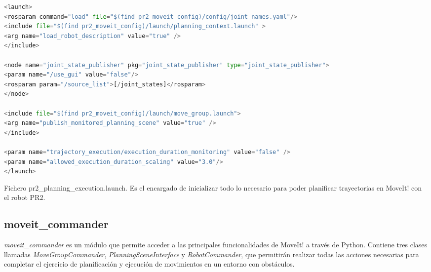 \documentclass[12pt,spanish,chapterprefix, numbers=noenddot]{book}
\numberwithin{equation}{section}
\numberwithin{figure}{section}
\begin{document}
\begin{algorithm}[htb!]
	\begin{lstlisting}[breaklines=true,language=python]  
<launch>
<rosparam command="load" file="$(find pr2_moveit_config)/config/joint_names.yaml"/>
<include file="$(find pr2_moveit_config)/launch/planning_context.launch" >
<arg name="load_robot_description" value="true" />
</include>

<node name="joint_state_publisher" pkg="joint_state_publisher" type="joint_state_publisher">
<param name="/use_gui" value="false"/>
<rosparam param="/source_list">[/joint_states]</rosparam>
</node>

<include file="$(find pr2_moveit_config)/launch/move_group.launch">
<arg name="publish_monitored_planning_scene" value="true" />
</include>

<param name="trajectory_execution/execution_duration_monitoring" value="false" />
<param name="allowed_execution_duration_scaling" value="3.0"/>
</launch>
	\end{lstlisting}
\caption{\label{alg:pr2_planning_execution}Fichero pr2\_planning\_execution.launch. Es el encargado de inicializar todo lo necesario para poder planificar trayectorias en MoveIt! con el robot PR2.}
\end{algorithm}

\subsection{moveit\_commander}
\textit{moveit\_commander} es un módulo que permite acceder a las principales funcionalidades de MoveIt! a través de Python. Contiene tres clases llamadas  \textit{MoveGroupCommander}, \textit{PlanningSceneInterface} y \textit{RobotCommander}, que permitirán realizar todas las acciones necesarias para completar el ejercicio de planificación y ejecución de movimientos en un entorno con obstáculos. 
\end{document}
